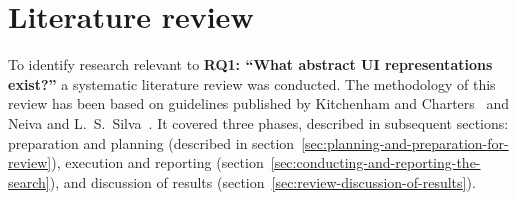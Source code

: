 \chapter{Literature review}\label{ch:literature-review}

To identify research relevant to \textbf{RQ1: \enquote{What abstract UI representations exist?}} a systematic literature review was conducted.
The methodology of this review has been based on guidelines published by Kitchenham and Charters~\cite{kitchenham_guidelines_2007} and Neiva and L.~S.~Silva~\cite{neiva_systematic_2016}.
It covered three phases, described in subsequent sections: preparation and planning (described in section~\ref{sec:planning-and-preparation-for-review}), execution and reporting (section~\ref{sec:conducting-and-reporting-the-search}), and discussion of results (section~\ref{sec:review-discussion-of-results}).






